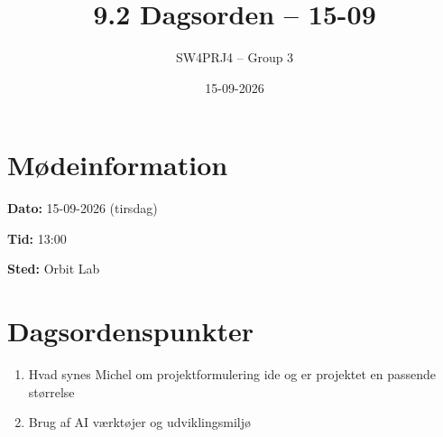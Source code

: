 \documentclass[a4paper,11pt]{article}
\title{9.2 Dagsorden -- 15-09}
\author{SW4PRJ4 -- Group 3}
\date{15-09-2026}
\begin{document}
\maketitle

\section*{Mødeinformation}

\textbf{Dato:} 15-09-2026 (tirsdag)

\textbf{Tid:} 13:00

\textbf{Sted:} Orbit Lab

\section*{Dagsordenspunkter}

\begin{enumerate}
    \item Hvad synes Michel om projektformulering ide og er projektet en passende størrelse
    \item Brug af AI værktøjer og udviklingsmiljø
\end{enumerate}
\end{document}

